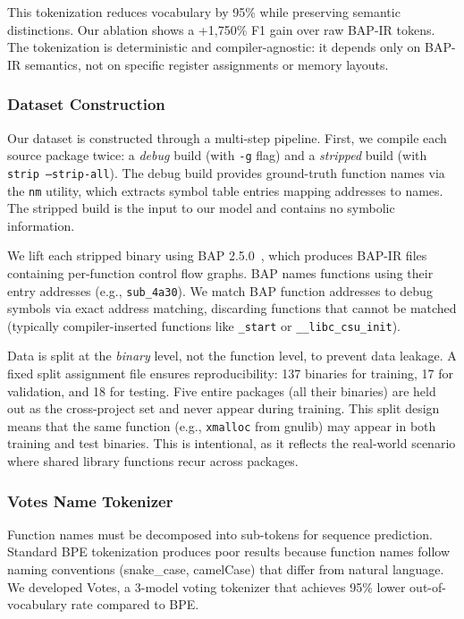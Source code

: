 \documentclass[sigconf,nonacm]{acmart}
\begin{document}
This tokenization reduces vocabulary by 95\% while preserving semantic distinctions. Our ablation shows a +1,750\% F1 gain over raw BAP-IR tokens. The tokenization is deterministic and compiler-agnostic: it depends only on BAP-IR semantics, not on specific register assignments or memory layouts.

\subsubsection{Dataset Construction}
\label{sec:dataset_construction}

Our dataset is constructed through a multi-step pipeline. First, we compile each source package twice: a \emph{debug} build (with \texttt{-g} flag) and a \emph{stripped} build (with \texttt{strip --strip-all}). The debug build provides ground-truth function names via the \texttt{nm} utility, which extracts symbol table entries mapping addresses to names. The stripped build is the input to our model and contains no symbolic information.

We lift each stripped binary using BAP 2.5.0~\cite{bap}, which produces BAP-IR files containing per-function control flow graphs. BAP names functions using their entry addresses (e.g., \texttt{sub\_4a30}). We match BAP function addresses to debug symbols via exact address matching, discarding functions that cannot be matched (typically compiler-inserted functions like \texttt{\_start} or \texttt{\_\_libc\_csu\_init}).

Data is split at the \emph{binary} level, not the function level, to prevent data leakage. A fixed split assignment file ensures reproducibility: 137 binaries for training, 17 for validation, and 18 for testing. Five entire packages (all their binaries) are held out as the cross-project set and never appear during training. This split design means that the same function (e.g., \texttt{xmalloc} from gnulib) may appear in both training and test binaries. This is intentional, as it reflects the real-world scenario where shared library functions recur across packages.

\subsubsection{Votes Name Tokenizer}
\label{sec:votes}

Function names must be decomposed into sub-tokens for sequence prediction. Standard BPE tokenization produces poor results because function names follow naming conventions (snake\_case, camelCase) that differ from natural language. We developed Votes, a 3-model voting tokenizer that achieves 95\% lower out-of-vocabulary rate compared to BPE.
\end{document}
